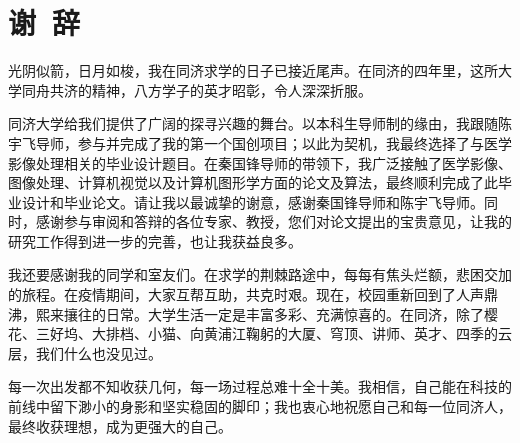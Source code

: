 \section*{谢\ 辞}

光阴似箭，日月如梭，我在同济求学的日子已接近尾声。在同济的四年里，这所大学同舟共济的精神，八方学子的英才昭彰，令人深深折服。

同济大学给我们提供了广阔的探寻兴趣的舞台。以本科生导师制的缘由，我跟随陈宇飞导师，参与并完成了我的第一个国创项目；以此为契机，我最终选择了与医学影像处理相关的毕业设计题目。在秦国锋导师的带领下，我广泛接触了医学影像、图像处理、计算机视觉以及计算机图形学方面的论文及算法，最终顺利完成了此毕业设计和毕业论文。请让我以最诚挚的谢意，感谢秦国锋导师和陈宇飞导师。同时，感谢参与审阅和答辩的各位专家、教授，您们对论文提出的宝贵意见，让我的研究工作得到进一步的完善，也让我获益良多。

我还要感谢我的同学和室友们。在求学的荆棘路途中，每每有焦头烂额，悲困交加的旅程。在疫情期间，大家互帮互助，共克时艰。现在，校园重新回到了人声鼎沸，熙来攘往的日常。大学生活一定是丰富多彩、充满惊喜的。在同济，除了樱花、三好坞、大排档、小猫、向黄浦江鞠躬的大厦、穹顶、讲师、英才、四季的云层，我们什么也没见过。

每一次出发都不知收获几何，每一场过程总难十全十美。我相信，自己能在科技的前线中留下渺小的身影和坚实稳固的脚印；我也衷心地祝愿自己和每一位同济人，最终收获理想，成为更强大的自己。


